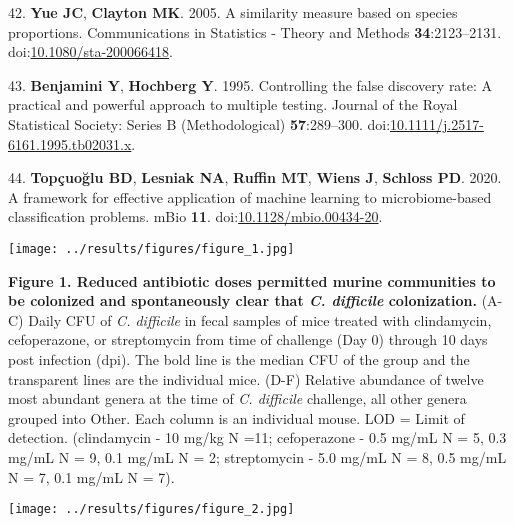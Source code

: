 \documentclass[11pt,]{article}
\newlength{\cslhangindent}
\newenvironment{cslreferences}%
  {\setlength{\parindent}{0pt}%
  \everypar{\setlength{\hangindent}{\cslhangindent}}\ignorespaces}%
  {\par}
\begin{document}
\begin{cslreferences}
\leavevmode\hypertarget{ref-yue2005}{}%
42. \textbf{Yue JC}, \textbf{Clayton MK}. 2005. A similarity measure
based on species proportions. Communications in Statistics - Theory and
Methods \textbf{34}:2123--2131.
doi:\href{https://doi.org/10.1080/sta-200066418}{10.1080/sta-200066418}.

\leavevmode\hypertarget{ref-benjamini1995}{}%
43. \textbf{Benjamini Y}, \textbf{Hochberg Y}. 1995. Controlling the
false discovery rate: A practical and powerful approach to multiple
testing. Journal of the Royal Statistical Society: Series B
(Methodological) \textbf{57}:289--300.
doi:\href{https://doi.org/10.1111/j.2517-6161.1995.tb02031.x}{10.1111/j.2517-6161.1995.tb02031.x}.

\leavevmode\hypertarget{ref-topcuoglu2020}{}%
44. \textbf{Topçuoğlu BD}, \textbf{Lesniak NA}, \textbf{Ruffin MT},
\textbf{Wiens J}, \textbf{Schloss PD}. 2020. A framework for effective
application of machine learning to microbiome-based classification
problems. mBio \textbf{11}.
doi:\href{https://doi.org/10.1128/mbio.00434-20}{10.1128/mbio.00434-20}.
\end{cslreferences}

\newpage

\texttt{[image: ../results/figures/figure\_1.jpg]}

\textbf{Figure 1. Reduced antibiotic doses permitted murine communities
to be colonized and spontaneously clear that \emph{C. difficile}
colonization.} (A-C) Daily CFU of \emph{C. difficile} in fecal samples
of mice treated with clindamycin, cefoperazone, or streptomycin from
time of challenge (Day 0) through 10 days post infection (dpi). The bold
line is the median CFU of the group and the transparent lines are the
individual mice. (D-F) Relative abundance of twelve most abundant genera
at the time of \emph{C. difficile} challenge, all other genera grouped
into Other. Each column is an individual mouse. LOD = Limit of
detection. (clindamycin - 10 mg/kg N =11; cefoperazone - 0.5 mg/mL N =
5, 0.3 mg/mL N = 9, 0.1 mg/mL N = 2; streptomycin - 5.0 mg/mL N = 8, 0.5
mg/mL N = 7, 0.1 mg/mL N = 7).

\hfill\break

\texttt{[image: ../results/figures/figure\_2.jpg]}
\end{document}
